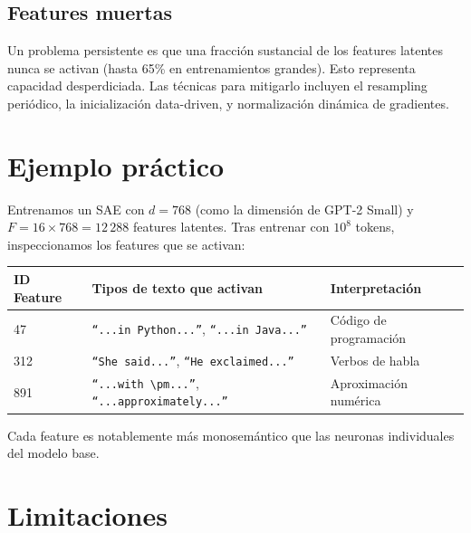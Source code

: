 \documentclass[11pt,a4paper]{report}
\theoremstyle{definition}
\begin{document}
\subsection{Features muertas}

Un problema persistente es que una fracción sustancial de los features latentes nunca se activan (hasta 65\% en entrenamientos grandes). Esto representa capacidad desperdiciada. Las técnicas para mitigarlo incluyen el resampling periódico, la inicialización data-driven, y normalización dinámica de gradientes.

\section{Ejemplo práctico}

Entrenamos un SAE con $d = 768$ (como la dimensión de GPT-2 Small) y $F = 16 \times 768 = 12\,288$ features latentes. Tras entrenar con $10^8$ tokens, inspeccionamos los features que se activan:

\begin{center}
\begin{tabular}{lll}
\toprule
\textbf{ID Feature} & \textbf{Tipos de texto que activan} & \textbf{Interpretación} \\
\midrule
47 & \texttt{``...in Python...''}, \texttt{``...in Java...''} & Código de programación \\
312 & \texttt{``She said...''}, \texttt{``He exclaimed...''} & Verbos de habla \\
891 & \texttt{``...with $\pm$...''}, \texttt{``...approximately...''} & Aproximación numérica \\
\bottomrule
\end{tabular}
\end{center}

Cada feature es notablemente más monosemántico que las neuronas individuales del modelo base.

\section{Limitaciones}
\end{document}
